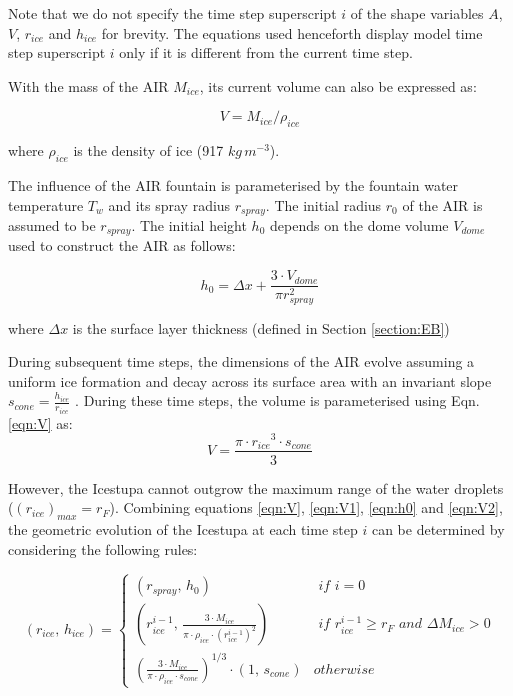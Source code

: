 \documentclass[utf8]{frontiersSCNS} %
\begin{document}
Note that we do not specify the time step superscript $i$ of the shape variables $A$, $V$, $r_{ice}$ and $h_{ice}$ for
brevity.  The equations used henceforth display model time step superscript $i$ only if it is different from the
current time step.

With the mass of the AIR $M_{ice}$, its current volume can also be expressed as: 

\begin{equation} V = M_{ice} /\rho_{ice} \label{eqn:V1} \end{equation} 

where $\rho_{ice}$ is the density of ice (917 $kg\, m^{-3}$). 


The influence of the AIR fountain is parameterised by the fountain water temperature $T_{w}$ and its spray radius $r_{spray}$.
The initial radius $r_0$ of the AIR is assumed to be $r_{spray}$. The initial height $h_0$ depends on the dome volume
$V_{dome}$ used to construct the AIR as follows:

\begin{equation} 
    h_{0} =  \Delta x + \frac{3 \cdot V_{dome}}{\pi r_{spray}^2 } 
\label{eqn:h0}
  \end{equation}

where $\Delta x$ is the surface layer thickness (defined in Section \ref{section:EB})

During subsequent time steps, the dimensions of the AIR evolve assuming a uniform ice formation and decay across
its surface area with an invariant slope $s_{cone} = \frac{h_{ice}}{r_{ice}}$ .  During
these time steps, the volume is parameterised using Eqn. \ref{eqn:V} as:\begin{equation} V = \frac{\pi \cdot {r_{ice}}^3
    \cdot s_{cone}}{3} \label{eqn:V2} \end{equation} 


However, the Icestupa cannot outgrow the maximum range of the water droplets ($(r_{ice})_{max} = r_{F}$). Combining
equations \ref{eqn:V},  \ref{eqn:V1}, \ref{eqn:h0} and \ref{eqn:V2}, the geometric evolution of the Icestupa at each time step $i$ can
be determined by considering the following rules:

\begin{equation} (r_{ice},\, h_{ice}) = \left\{ \begin{array}{ll} (r_{spray} ,\, h_0) & \textit{ if } i=0\\
    (r_{ice}^{i-1},\, \frac{3 \cdot M_{ice}}{\pi \cdot \rho_{ice} \cdot {(r_{ice}^{i-1})}^2}) & \textit{ if }
    r_{ice}^{i-1} \geq r_{F} \textit{ and } \Delta M_{ice} > 0 \\ (\frac{3 \cdot M_{ice}}{\pi \cdot \rho_{ice} \cdot s_{cone}})^{1/3} \cdot (1,\,  s_{cone}) &
otherwise \end{array} \right.  \label{eqn:A2} \end{equation}
\end{document}
